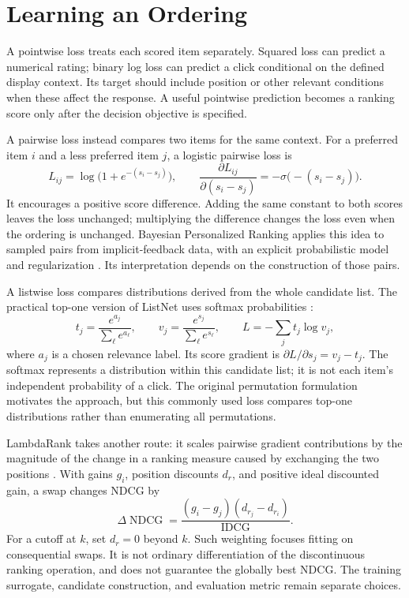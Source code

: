 \section{Learning an Ordering}

A pointwise loss treats each scored item separately. Squared loss can predict a numerical rating; binary log loss can predict a click conditional on the defined display context. Its target should include position or other relevant conditions when these affect the response. A useful pointwise prediction becomes a ranking score only after the decision objective is specified.

A pairwise loss instead compares two items for the same context. For a preferred item $i$ and a less preferred item $j$, a logistic pairwise loss is
\[
L_{ij}=\log\bigl(1+e^{-(s_i-s_j)}\bigr),
\qquad
\frac{\partial L_{ij}}{\partial(s_i-s_j)}=-\sigma\bigl(-(s_i-s_j)\bigr).
\]
It encourages a positive score difference. Adding the same constant to both scores leaves the loss unchanged; multiplying the difference changes the loss even when the ordering is unchanged. Bayesian Personalized Ranking applies this idea to sampled pairs from implicit-feedback data, with an explicit probabilistic model and regularization \citep{rendle2009bpr}. Its interpretation depends on the construction of those pairs.

A listwise loss compares distributions derived from the whole candidate list. The practical top-one version of ListNet uses softmax probabilities \citep{cao2007listnet}:
\[
t_j=\frac{e^{a_j}}{\sum_\ell e^{a_\ell}},\qquad
v_j=\frac{e^{s_j}}{\sum_\ell e^{s_\ell}},\qquad
L=-\sum_j t_j\log v_j,
\]
where $a_j$ is a chosen relevance label. Its score gradient is $\partial L/\partial s_j=v_j-t_j$. The softmax represents a distribution within this candidate list; it is not each item's independent probability of a click. The original permutation formulation motivates the approach, but this commonly used loss compares top-one distributions rather than enumerating all permutations.

LambdaRank takes another route: it scales pairwise gradient contributions by the magnitude of the change in a ranking measure caused by exchanging the two positions \citep{burges2010lambdarank}. With gains $g_i$, position discounts $d_r$, and positive ideal discounted gain, a swap changes NDCG by
\[
\Delta\operatorname{NDCG}
=\frac{(g_i-g_j)(d_{r_j}-d_{r_i})}{\operatorname{IDCG}}.
\]
For a cutoff at $k$, set $d_r=0$ beyond $k$. Such weighting focuses fitting on consequential swaps. It is not ordinary differentiation of the discontinuous ranking operation, and does not guarantee the globally best NDCG. The training surrogate, candidate construction, and evaluation metric remain separate choices.

